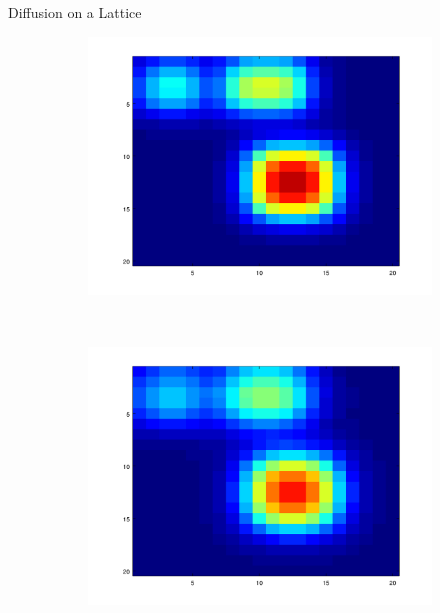 \documentclass{beamer}
\begin{document}
\begin{frame}{Diffusion on a Lattice}
\begin{figure}[!h]
\begin{subfigure}[b]{0.25\textwidth}
		\includegraphics[width= \textwidth]{images/anim_30.png}
	\end{subfigure}~
	\begin{subfigure}[b]{0.25\textwidth}
		\includegraphics[width= \textwidth]{images/anim_45.png}
	\end{subfigure}\\
    \begin{subfigure}[b]{0.25\textwidth}

\end{subfigure}
\end{figure}
\end{frame}
\end{document}
